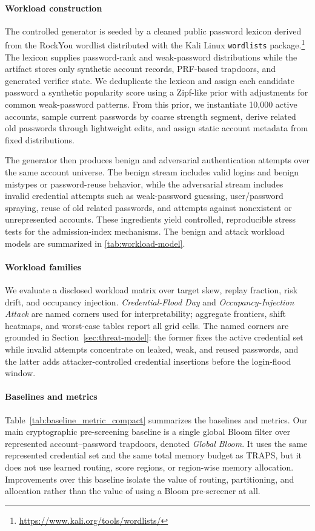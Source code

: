 \paragraph{Workload construction}
The controlled generator is seeded by a cleaned public password lexicon derived from the RockYou wordlist distributed with the Kali Linux \texttt{wordlists} package.\footnote{\url{https://www.kali.org/tools/wordlists/}} The lexicon supplies password-rank and weak-password distributions while the artifact stores only synthetic account records, PRF-based trapdoors, and generated verifier state. We deduplicate the lexicon and assign each candidate password a synthetic popularity score using a Zipf-like prior with adjustments for common weak-password patterns. From this prior, we instantiate 10{,}000 active accounts, sample current passwords by coarse strength segment, derive related old passwords through lightweight edits, and assign static account metadata from fixed distributions.

The generator then produces benign and adversarial authentication attempts over the same account universe. The benign stream includes valid logins and benign mistypes or password-reuse behavior, while the adversarial stream includes invalid credential attempts such as weak-password guessing, user/password spraying, reuse of old related passwords, and attempts against nonexistent or unrepresented accounts. These ingredients yield controlled, reproducible stress tests for the admission-index mechanisms. The benign and attack workload models are summarized in \autoref{tab:workload-model}.

\paragraph{Workload families}
We evaluate a disclosed workload matrix over target skew, replay fraction, risk drift, and occupancy injection. \emph{Credential-Flood Day} and \emph{Occupancy-Injection Attack} are named corners used for interpretability; aggregate frontiers, shift heatmaps, and worst-case tables report all grid cells. The named corners are grounded in Section~\ref{sec:threat-model}: the former fixes the active credential set while invalid attempts concentrate on leaked, weak, and reused passwords, and the latter adds attacker-controlled credential insertions before the login-flood window.

\paragraph{Baselines and metrics}
Table~\ref{tab:baseline_metric_compact} summarizes the baselines and metrics. Our main cryptographic pre-screening baseline is a single global Bloom filter over represented account--password trapdoors, denoted \emph{Global Bloom}. It uses the same represented credential set and the same total memory budget as TRAPS, but it does not use learned routing, score regions, or region-wise memory allocation. Improvements over this baseline isolate the value of routing, partitioning, and allocation rather than the value of using a Bloom pre-screener at all.

